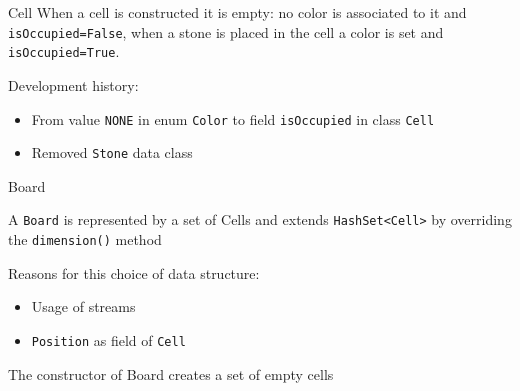 \documentclass{beamer}
\begin{document}
\begin{frame}{Cell}
	When a cell is constructed it is empty: no color is associated to it and \texttt{isOccupied=False}, when a stone is placed in the cell a color is set and \texttt{isOccupied=True}.
	

Development history:
\begin{itemize}
\item From value \texttt{NONE} in enum \texttt{Color} to field \texttt{isOccupied} in class \texttt{Cell}
\item Removed \texttt{Stone} data class
\end{itemize}


\end{frame}


\begin{frame}{Board}

A \texttt{Board} is represented by a set of Cells and extends \texttt{HashSet<Cell>} by overriding the \texttt{dimension()} method

Reasons for this choice of data structure:
\begin{itemize}
    \item Usage of streams
    \item \texttt{Position} as field of \texttt{Cell}    
\end{itemize}




The constructor of Board creates a set of empty cells

\end{frame}
\end{document}

